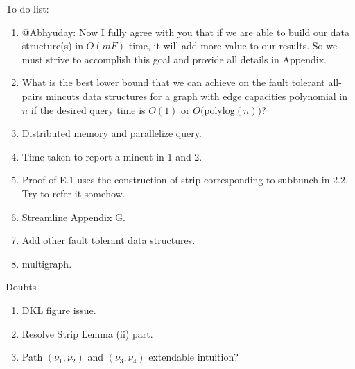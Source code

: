 {\color{blue} To do list:
\begin{enumerate}








\item @Abhyuday: Now I fully agree with you that if we are able to build our data structure(s) in $O(mF)$ time, it will add more value to our results. So we must strive to accomplish this goal and provide all details in Appendix.
\item What is the best lower bound that we can achieve on the fault tolerant all-pairs mincuts data structures for a graph with edge capacities polynomial in $n$ if the desired query time is $O(1)$ or $O($polylog$(n))$?
\item Distributed memory and parallelize query.
\item Time taken to report a mincut in 1 and 2.
\item Proof of E.1 uses the construction of strip corresponding to subbunch in 2.2. Try to refer it somehow.
\item Streamline Appendix G.
\item Add other fault tolerant data structures.
\item multigraph.
\end{enumerate}}


{

\color{brown} Doubts
\begin{enumerate}
    \item DKL figure issue.
    \item Resolve Strip Lemma (ii) part.
    \item Path $(\nu_1,\nu_2)$ and $(\nu_3,\nu_4)$ extendable intuition?
\end{enumerate}
}


